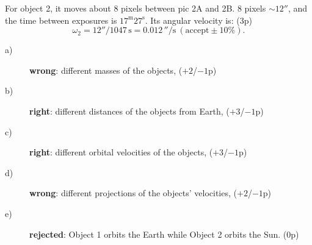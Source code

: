 \begin{enumerate}
For object 2, it moves about 8 pixels between pic 2A and 2B. 8 pixels
$\sim 12''$, and the time between exposures is $17^{\mathrm{m}}27^{\mathrm{s}}$.
Its angular velocity is: \hfill(3p)
\[ \omega_2 = 12''/1047\,\mathrm{s} = 0.012\,''/\mathrm{s}\ (\text{accept} \pm 10\%). \]
\begin{description}
\item[a)] \textbf{wrong}: different masses of the objects, \hfill($+2$/$-1$p)
\item[b)] \textbf{right}: different distances of the objects from Earth,
  \hfill($+3$/$-1$p)
\item[c)] \textbf{right}: different orbital velocities of the objects,
  \hfill($+3$/$-1$p)
\item[d)] \textbf{wrong}: different projections of the objects' velocities,
  \hfill($+2$/$-1$p)
\item[e)] \textbf{rejected}: Object 1 orbits the Earth while Object 2 orbits
  the Sun. \hfill(0p)
\end{description}
\end{enumerate}
